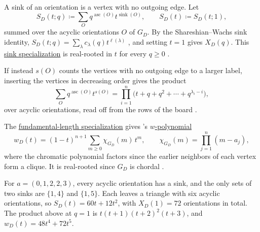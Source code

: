 A sink of an orientation is a vertex with no outgoing edge.  Let
\[
  S_D(t;q)\coloneqq\sum_{O}q^{\operatorname{asc}(O)}t^{\operatorname{sink}(O)},
  \qquad S_D(t)\coloneqq S_D(t;1),
\]
summed over the acyclic orientations $O$ of $G_D$.  By the Shareshian--Wachs
sink identity, $S_D(t;q)=\sum_\lambda c_\lambda(q)t^{\ell(\lambda)}$
\cite[Thm.~5.3]{ShareshianWachs2016}, and setting $t=1$ gives $X_D(q)$.  This
\hyperref[chromaticSinkRealRooted]{sink specialization} is real-rooted in $t$
for every $q\geq0$ \cite[Thm.~5.2]{AlexanderssonLeite2026x}.

If instead $s(O)$ counts the vertices with no outgoing edge to a larger
label, inserting the vertices in decreasing order gives the product
\[
  \sum_{O}q^{\operatorname{asc}(O)}t^{s(O)}
  =\prod_{i=1}^{n}\bigl(t+q+q^2+\dotsb+q^{\lambda_i-i}\bigr),
\]
over acyclic orientations, read off from the rows of the board
\cite[Prop.~40]{AlexanderssonLeite2026x}.

The \hyperref[gesselLengthSpecialization]{fundamental-length
specialization} gives 's
\hyperref[chromaticWPolynomial]{$w$-polynomial}
\[
  w_D(t)=(1-t)^{n+1}\sum_{m\geq0}\chi_{G_D}(m)\,t^m,\qquad
  \chi_{G_D}(m)=\prod_{j=1}^{n}(m-a_j),
\]
where the chromatic polynomial factors since the earlier neighbors of each
vertex form a clique.  It is real-rooted since $G_D$ is chordal
\cite[Thms.~4.11 and~4.15]{Brenti1992}.

\begin{example*}
For $a=(0,1,2,2,3)$, every acyclic orientation has a sink, and the only sets of
two sinks are $\{1,4\}$ and $\{1,5\}$.  Each leaves a triangle with six acyclic
orientations, so $S_D(t)=60t+12t^2$, with $X_D(1)=72$ orientations in total.
The product above at $q=1$ is $t(t+1)(t+2)^2(t+3)$, and
$w_D(t)=48t^4+72t^5$.
\end{example*}


